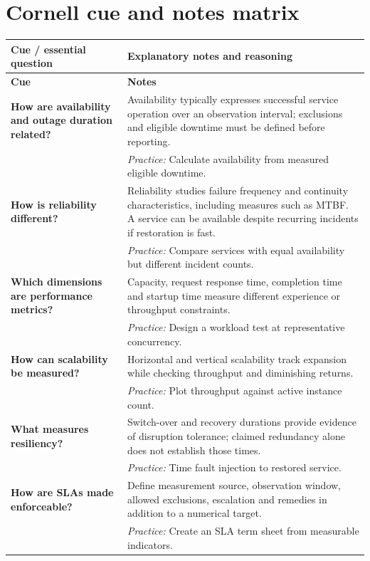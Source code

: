 \documentclass[10pt,letterpaper]{article}
\begin{document}
\section{Cornell cue and notes matrix}
\small\setlength{\LTleft}{0pt}\setlength{\LTright}{0pt plus 1fill}
\begin{longtable}{>{\RaggedRight\arraybackslash}p{}>{\RaggedRight\arraybackslash}p{}}
\toprule\textbf{Cue / essential question}&\textbf{Explanatory notes and reasoning}\\\midrule\endfirsthead\toprule\textbf{Cue}&\textbf{Notes}\\\midrule\endhead
\textbf{How are availability and outage duration related?} & Availability typically expresses successful service operation over an observation interval; exclusions and eligible downtime must be defined before reporting.\\[3pt]& \textcolor{petrol}{\emph{Practice:} Calculate availability from measured eligible downtime.}\\[8pt]\midrule
\textbf{How is reliability different?} & Reliability studies failure frequency and continuity characteristics, including measures such as MTBF. A service can be available despite recurring incidents if restoration is fast.\\[3pt]& \textcolor{petrol}{\emph{Practice:} Compare services with equal availability but different incident counts.}\\[8pt]\midrule
\textbf{Which dimensions are performance metrics?} & Capacity, request response time, completion time and startup time measure different experience or throughput constraints.\\[3pt]& \textcolor{petrol}{\emph{Practice:} Design a workload test at representative concurrency.}\\[8pt]\midrule
\textbf{How can scalability be measured?} & Horizontal and vertical scalability track expansion while checking throughput and diminishing returns.\\[3pt]& \textcolor{petrol}{\emph{Practice:} Plot throughput against active instance count.}\\[8pt]\midrule
\textbf{What measures resiliency?} & Switch-over and recovery durations provide evidence of disruption tolerance; claimed redundancy alone does not establish those times.\\[3pt]& \textcolor{petrol}{\emph{Practice:} Time fault injection to restored service.}\\[8pt]\midrule
\textbf{How are SLAs made enforceable?} & Define measurement source, observation window, allowed exclusions, escalation and remedies in addition to a numerical target.\\[3pt]& \textcolor{petrol}{\emph{Practice:} Create an SLA term sheet from measurable indicators.}\\[8pt]\midrule
\end{longtable}\normalsize
\end{document}
